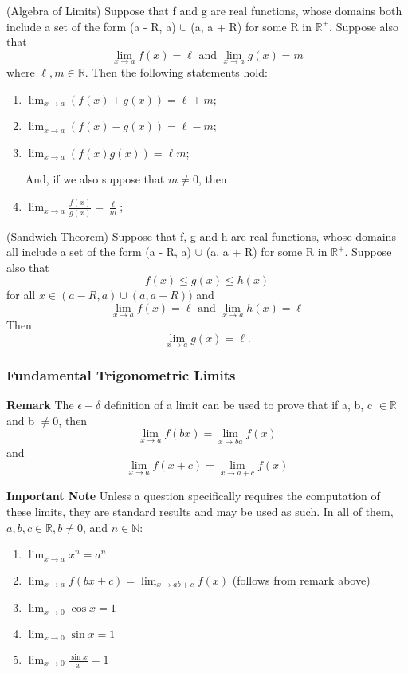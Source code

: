 \documentclass[12pt]{article}
\begin{document}
			\begin{thm}
				(Algebra of Limits) Suppose that f and g are real functions, whose domains both include a set of the 						form (a - R, a) $\cup$ (a, a + R) for some R in $\mathbb{R}^+$. Suppose also that
					\[
						\lim_{x \to a}{f(x)} = \ell     \mbox{     and     }     \lim_{x \to a}{g(x)} = m
					\]
				where $\ell, m \in \mathbb{R}$. Then the following statements hold:
					\begin{enumerate}
						\item $\lim_{x \to a}{(f(x) + g(x))} = \ell + m$;
						\item $\lim_{x \to a}{(f(x) - g(x))} = \ell - m$;
						\item $\lim_{x \to a}{(f(x)g(x))} = \ell m$;

				And, if we also suppose that $m \neq 0$, then

						\item $\lim_{x \to a}{\frac{f(x)}{g(x)}} = \frac{\ell}{m}$;
					\end{enumerate}
			\end{thm}

			\begin{thm}
				(Sandwich Theorem) Suppose that f, g and h are real functions, whose domains all include a set of 						the form (a - R, a) $\cup$ (a, a + R) for some R in $\mathbb{R}^+$. Suppose also that
						\[
							f(x) \leq g(x) \leq h(x)
						\]
				for all $x \in (a - R, a) \cup (a, a + R))$ and
						\[
							\lim_{x \to a}{f(x)} = \ell \mbox{    and    } \lim_{x \to a}{h(x)} = \ell
						\]
				Then 
						\[
							\lim_{x \to a}{g(x)} = \ell.
						\]
			\end{thm}

		\subsubsection{Fundamental Trigonometric Limits}

			{\bf{Remark}}	The $\epsilon-\delta$ definition of a limit can be used to prove that if a, b, c $\in 							\mathbb{R}$ and b $\neq 0$, then
						\[
						\lim_{x \to a}{f(bx)} = \lim_{x \to ba}{f(x)}
						\]			
				and
						\[
						\lim_{x \to a}{f(x + c)} = \lim_{x \to a + c}{f(x)}
						\]

			{\bf{Important Note}} Unless a question specifically requires the computation of these limits, they are 						standard results and may be used as such. In all of them, $a, b, c \in \mathbb{R}, b \neq 0$, and 					$n \in \mathbb{N}$:
					\begin{enumerate}
						\item $\lim_{x \to a}{x^n} = a^n$
						\item $\lim_{x \to a}{f(bx + c)} = \lim_{x \to ab + c}{f(x)}$ (follows from remark 									above)
						\item $\lim_{x \to 0}{\cos x} = 1$
						\item $\lim_{x \to 0}{\sin x} = 1$
						\item $\lim_{x \to 0}{\frac{\sin x}{x}} = 1$
					\end{enumerate}
\end{document}
